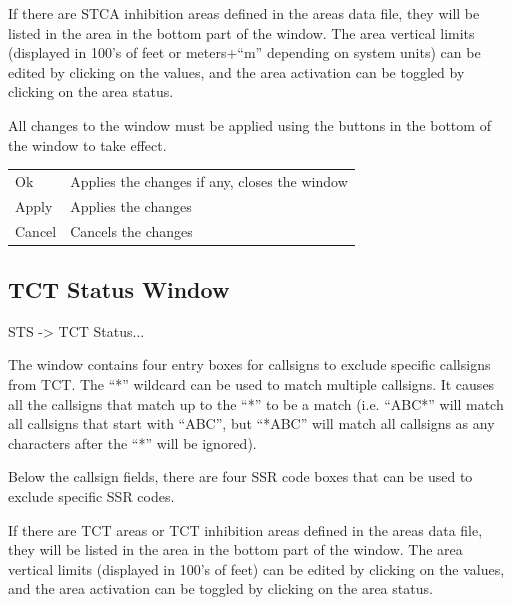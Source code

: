 \documentclass[a4paper,oneside,11pt]{memoir}
\begin{document}
\bigskip

If there are STCA inhibition areas defined in the areas data file, they will be listed in the area in the bottom part of the window. The area vertical limits (displayed in 100’s of feet or meters+“m” depending on system units) can be edited by clicking on the values, and the area activation can be toggled by clicking on the area status.

\bigskip

All changes to the window must be applied using the buttons in the bottom of the window to take effect.

\bigskip

\begin{longtable}{p{2.5cm} p{10cm}}
    Ok      & Applies the changes if any, closes the window\\
    Apply   & Applies the changes\\
    Cancel  & Cancels the changes\\
\end{longtable}

\subsection{TCT Status Window}
\label{win:tctsw}

 STS -> TCT Status...

\bigskip


The window contains four entry boxes for callsigns to exclude specific callsigns from TCT. The “*” wildcard can be used to match multiple callsigns. It causes all the callsigns that match up to the “*” to be a match (i.e. “ABC*” will match all callsigns that start with “ABC”, but “*ABC” will match all callsigns as any characters after the “*” will be ignored). 

\bigskip

Below the callsign fields, there are four SSR code boxes that can be used to exclude specific SSR codes.

\bigskip

If there are TCT areas or TCT inhibition areas defined in the areas data file, they will be listed in the area in the bottom part of the window. The area vertical limits (displayed in 100’s of feet) can be edited by clicking on the values, and the area activation can be toggled by clicking on the area status.

\bigskip
\end{document}
